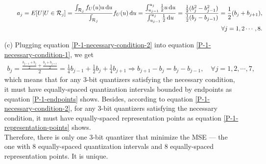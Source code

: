 \documentclass{assignment}
\begin{document}
\begin{sol}
\begin{itemize}
\begin{itemize}
            \begin{align}
                \label{P-1-necessary-condition-2}
                \notag a_j=E[U\vert U\in\mathcal{R}_j]=\frac{\int_{\mathcal{R}_j}f_U(u)u\,\mathrm{d}u}{\int_{\mathcal{R}_j}}f_U(u)\,\mathrm{d}u=\frac{\int_{u_{j-1}}^{u_j}\frac{1}{2}u\,\mathrm{d}u}{\int_{u_{j-1}}^{u_j}\frac{1}{2}\,\mathrm{d}u}=\frac{\frac{1}{2}(b_j^2-b_{j-1}^2)}{\frac{1}{2}(b_j-b_{j-1})}=\frac{1}{2}(b_j+b_{j+1}),\\
                \forall j=1,2\cdots,8.
            \end{align}
        \end{itemize}
        \item[(c)] Plugging equation \eqref{P-1-necessary-condition-2} into equation \eqref{P-1-necessary-condition-1}, we get
        \begin{align}
            b_j=\frac{\frac{b_{j-1}+b_j}{2}+\frac{b_j+b_{j+1}}{2}}{2}=\frac{1}{4}b_{j-1}+\frac{1}{2}b_j+\frac{1}{4}b_{j+1}\Longrightarrow b_{j+1}-b_j=b_j-b_{j-1},\quad\forall j=1,2,\cdots,7,
        \end{align}
        which means that for any $3$-bit quantizers satisfying the necessary condition, it must have equally-spaced quantization intervals bounded by endpoints as equation \eqref{P-1-endpoints} shows. Besides, according to equation \eqref{P-1-necessary-condition-2}, for any $3$-bit quantizers satisfying the necessary condition, it must have equally-spaced representation points as equation \eqref{P-1-representation-points} shows.\\
        Therefore, there is only one $3$-bit quantizer that minimize the MSE --- the one with $8$ equally-spaced quantization intervals and $8$ equally-spaced representation points. It is unique.
    \end{itemize}
\end{sol}
\end{document}
